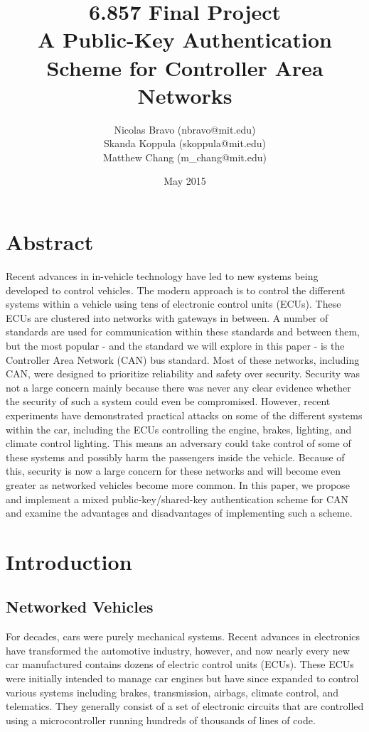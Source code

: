 \documentclass{article}
\title{6.857 Final Project \\ A Public-Key Authentication Scheme for Controller Area Networks}
\author{Nicolas Bravo (nbravo@mit.edu) \\ Skanda Koppula (skoppula@mit.edu) \\ Matthew Chang (m\_chang@mit.edu) }
\date{May 2015}
\begin{document}
\maketitle

\section{Abstract}
Recent advances in in-vehicle technology have led to new systems being developed to control vehicles. The modern approach is to control the different systems within a vehicle using tens of electronic control units (ECUs). These ECUs are clustered into networks with gateways in between. A number of standards are used for communication within these standards and between them, but the most popular - and the standard we will explore in this paper - is the Controller Area Network (CAN) bus standard. Most of these networks, including CAN, were designed to prioritize reliability and safety over security. Security was not a large concern mainly because there was never any clear evidence whether the security of such a system could even be compromised. However, recent experiments have demonstrated practical attacks on some of the different systems within the car, including the ECUs controlling the engine, brakes, lighting, and climate control lighting. This means an adversary could take control of some of these systems and possibly harm the passengers inside the vehicle. Because of this, security is now a large concern for these networks and will become even greater as networked vehicles become more common. In this paper, we propose and implement a mixed public-key/shared-key authentication scheme for CAN and examine the advantages and disadvantages of implementing such a scheme.


\section{Introduction}
    \subsection{Networked Vehicles}
    For decades, cars were purely mechanical systems. Recent advances in electronics have transformed the automotive industry, however, and now nearly every new car manufactured contains dozens of electric control units (ECUs). These ECUs were initially intended to manage car engines but have since expanded to control various systems including brakes, transmission, airbags, climate control, and telematics. They generally consist of a set of electronic circuits that are controlled using a microcontroller running hundreds of thousands of lines of code. 
    
\end{document}
